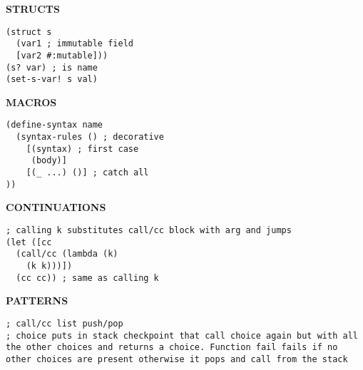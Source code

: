 \documentclass{article}
\begin{document}
\begin{multicols*}{3}
\hrulefill

\textbf{STRUCTS}
\begin{lstlisting}
(struct s
  (var1 ; immutable field
  [var2 #:mutable]))
(s? var) ; is name
(set-s-var! s val)
\end{lstlisting}

\hrulefill

\textbf{MACROS}
\begin{lstlisting}
(define-syntax name
  (syntax-rules () ; decorative
    [(syntax) ; first case
     (body)]
    [(_ ...) ()] ; catch all
))
\end{lstlisting}

\hrulefill

\textbf{CONTINUATIONS}
\begin{lstlisting}
; calling k substitutes call/cc block with arg and jumps
(let ([cc 
  (call/cc (lambda (k)
    (k k)))])
  (cc cc)) ; same as calling k
\end{lstlisting}

\hrulefill

\textbf{PATTERNS}
\begin{lstlisting}
; call/cc list push/pop
; choice puts in stack checkpoint that call choice again but with all the other choices and returns a choice. Function fail fails if no other choices are present otherwise it pops and call from the stack
\end{lstlisting}

\end{multicols*}
\end{document}

